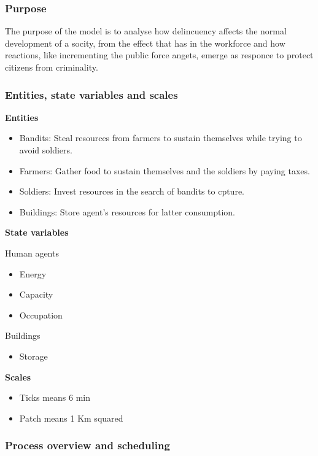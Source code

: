 \documentclass{wscpaperproc}
\theoremstyle{wsc}
\begin{document}
\subsubsection{Purpose}

The purpose of the model is to analyse how delincuency affects the normal
development of a socity, from the effect that has in the workforce and how
reactions, like incrementing the public force angets, emerge as responce to
protect citizens from criminality.

\subsubsection{Entities, state variables and scales}

\noindent \textbf{Entities}

\begin{itemize}
    \item Bandits: Steal resources from farmers to sustain themselves while trying to avoid soldiers.
    \item Farmers: Gather food to sustain themselves and the soldiers by paying taxes.
    \item Soldiers: Invest resources in the search of bandits to cpture.
    \item Buildings: Store agent's resources for latter consumption.
\end{itemize}

\noindent \textbf{State variables}

Human agents

\begin{itemize}
    \item Energy
    \item Capacity
    \item Occupation
\end{itemize}

Buildings

\begin{itemize}
    \item Storage
\end{itemize}

\noindent \textbf{Scales}

\begin{itemize}
    \item Ticks means 6 min
    \item Patch means 1 Km squared
\end{itemize}

\subsubsection{Process overview and scheduling}
\end{document}
